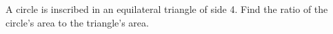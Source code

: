 A circle is inscribed in an equilateral triangle of side 4. Find the ratio of the circle's area to the triangle's area.
